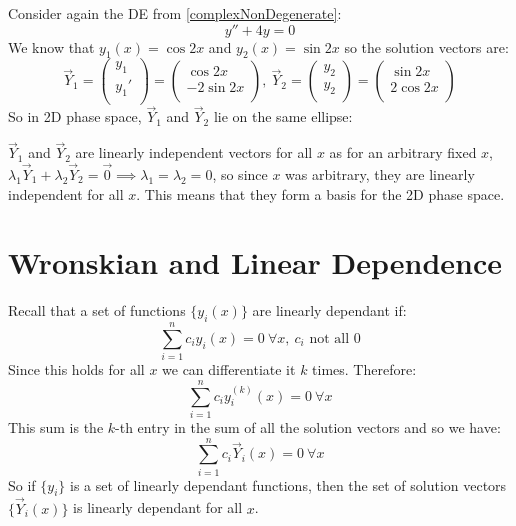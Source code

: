 \documentclass[../main.tex]{subfiles}
\begin{document}
\begin{example}
  Consider again the DE from \cref{complexNonDegenerate}:
  \[
    y'' + 4y = 0
  \]
  We know that $y_1(x) = \cos 2x$ and $y_2(x) = \sin 2x$ so the solution vectors are:
  \[
    \vec{Y}_1 = \begin{pmatrix}
    y_1 \\
    y_1' \\
    \end{pmatrix} =
    \begin{pmatrix}
    \cos 2x \\
    -2\sin 2x \\
    \end{pmatrix},\
    \vec{Y}_2 = \begin{pmatrix}
    y_2 \\
    y_2 \\
    \end{pmatrix} =
    \begin{pmatrix}
    \sin 2x \\
    2 \cos 2x \\
    \end{pmatrix}
  \]
  So in 2D phase space, $\vec{Y}_1$ and $\vec{Y}_2$ lie on the same ellipse:
  \begin{center}
  \end{center}
  $\vec{Y}_1$ and $\vec{Y}_2$ are linearly independent vectors for all $x$ as for an arbitrary fixed $x$, $\lambda_1 \vec{Y}_1 + \lambda_2 \vec{Y}_2 = \vec{0} \implies \lambda_1 = \lambda_2 = 0$, so since $x$ was arbitrary, they are linearly independent for all $x$.
  This means that they form a basis for the 2D phase space.
\end{example}
\section{Wronskian and Linear Dependence}
\label{wronskian}
Recall that a set of functions $\{y_i(x)\}$ are linearly dependant if:
\[
  \sum_{i=1}^{n} c_i y_i(x) = 0\ \forall x,\ c_i \text{ not all 0}
\]
Since this holds for all $x$ we can differentiate it $k$ times.
Therefore:
\[
  \sum_{i=1}^{n} c_i y^{(k)}_i(x) = 0\ \forall x
\]
This sum is the $k$-th entry in the sum of all the solution vectors and so we have:
\[
  \sum_{i=1}^{n} c_i \vec{Y}_i(x) = 0\ \forall x
\]
So if $\{y_i\}$ is a set of linearly dependant functions, then the set of solution vectors $\{\vec{Y}_i(x)\}$ is linearly dependant for all $x$.
\end{document}
